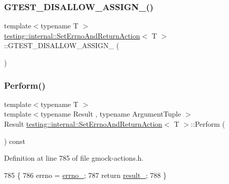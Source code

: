\subsubsection{\texorpdfstring{G\+T\+E\+S\+T\+\_\+\+D\+I\+S\+A\+L\+L\+O\+W\+\_\+\+A\+S\+S\+I\+G\+N\+\_\+()}{GTEST\_DISALLOW\_ASSIGN\_()}}
{\footnotesize\ttfamily template$<$typename T $>$ \\
\hyperlink{classtesting_1_1internal_1_1SetErrnoAndReturnAction}{testing\+::internal\+::\+Set\+Errno\+And\+Return\+Action}$<$ T $>$\+::G\+T\+E\+S\+T\+\_\+\+D\+I\+S\+A\+L\+L\+O\+W\+\_\+\+A\+S\+S\+I\+G\+N\+\_\+ (\begin{DoxyParamCaption}\item[{\hyperlink{classtesting_1_1internal_1_1SetErrnoAndReturnAction}{Set\+Errno\+And\+Return\+Action}$<$ T $>$}]{ }\end{DoxyParamCaption})\hspace{0.3cm}{\ttfamily [private]}}

\mbox{\label{classtesting_1_1internal_1_1SetErrnoAndReturnAction_a44025d0d124cab72878bf6bdb12c3693}} 
\subsubsection{\texorpdfstring{Perform()}{Perform()}}
{\footnotesize\ttfamily template$<$typename T $>$ \\
template$<$typename Result , typename Argument\+Tuple $>$ \\
Result \hyperlink{classtesting_1_1internal_1_1SetErrnoAndReturnAction}{testing\+::internal\+::\+Set\+Errno\+And\+Return\+Action}$<$ T $>$\+::Perform (\begin{DoxyParamCaption}\item[{const Argument\+Tuple \&}]{ }\end{DoxyParamCaption}) const\hspace{0.3cm}{\ttfamily [inline]}}



Definition at line 785 of file gmock-\/actions.\+h.


\begin{DoxyCode}
785                                                \{
786     errno = \hyperlink{classtesting_1_1internal_1_1SetErrnoAndReturnAction_ac4f5ce108de323f1f76654c38aa883a3}{errno\_};
787     \textcolor{keywordflow}{return} \hyperlink{classtesting_1_1internal_1_1SetErrnoAndReturnAction_a271f5a3b41aa3a7f06fbd69ad19b1c77}{result\_};
788   \}
\end{DoxyCode}


